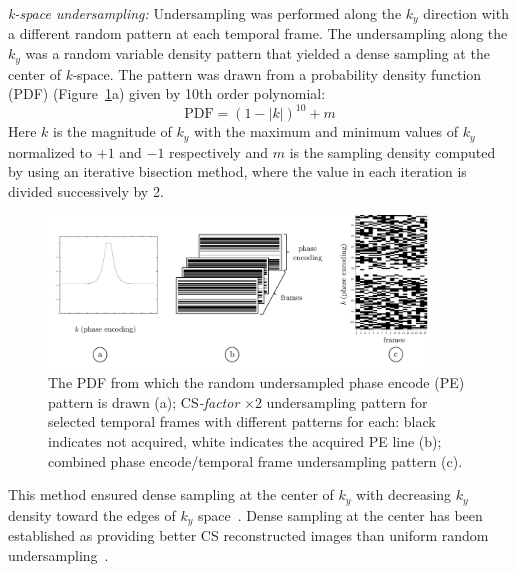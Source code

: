 \textit{k-space undersampling:}
Undersampling was performed along the $k_y$ direction with a different random pattern at each temporal frame. 
The undersampling along the $k_y$ was a random variable density pattern that yielded a dense sampling at the center of \mbox{\textit{k-}space}. 
The pattern was drawn from a probability density function (PDF) (Figure~\ref{fig: CS2}a) given by 10th order polynomial:
\begin{equation}\label{eq: CS1}
\mathrm{PDF} = (1-|k|)^{10} + m
\end{equation}
Here $k$ is the magnitude of $k_y$ with the maximum and minimum values of $k_y$ normalized to $+1$ and $-1$ respectively and $m$ is the sampling density computed by using an iterative bisection method, where the value in each iteration is divided successively by 2. 
\begin{figure}[!htb]
\vspace{+0.2cm}
\centering
\includegraphics[width=0.9\textwidth]{Figures/CS1_1.pdf}
\caption[The probability density function, two times undersampled pattern for selected temporal frames and combined phase encode/temporal frame undersampling pattern]{The PDF from which the random undersampled phase encode (PE) pattern is drawn (a); CS\textit{-factor} $\times 2$ undersampling pattern for selected temporal frames with different patterns for each: black indicates not acquired, white indicates the acquired PE line (b); combined phase encode/temporal frame undersampling pattern (c).}
\label{fig: CS2}
\end{figure}
This method ensured dense sampling at the center of $k_y$ with decreasing $k_y$ density toward the edges of $k_y$ space~\cite{RNCS10}. 
Dense sampling at the center has been established as providing better CS reconstructed images than uniform random undersampling~\cite{Lustig:2007cua, RNCS9}.

